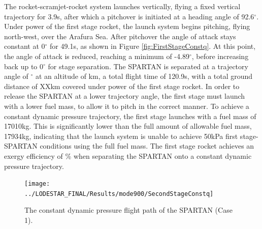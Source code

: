 The rocket-scramjet-rocket system launches vertically, flying a fixed vertical trajectory for 3.9s, after which a pitchover is initiated at a heading angle of 92.6$^\circ$. Under power of the first stage rocket, the launch system begins pitching, flying north-west, over the Arafura Sea. 
After pitchover the angle of attack stays constant at 0$^\circ$ for 49.1s, as shown in Figure \ref{fig:FirstStageConstq}. At this point, the angle of attack is reduced, reaching a minimum of -4.89$^\circ$, before increasing back up to 0$^\circ$ for stage separation. 
The SPARTAN is separated at a trajectory angle of \firstsecondSeparationgammaConstq$^\circ$ at an altitude of \firstsecondSeparationAltConstq km, a total flight time of 120.9s, with a total ground distance of XXkm covered under power of the first stage rocket. 
 In order to release the SPARTAN at a lower trajectory angle, the first stage must launch with a lower fuel mass, to allow it to pitch in the correct manner. To achieve a constant dynamic pressure trajectory, the first stage launches with a fuel mass of 17010kg. This is significantly lower than the full amount of allowable fuel mass, 17934kg, indicating that the launch system is unable to achieve 50kPa first stage-SPARTAN conditions using the full fuel mass. 
The first stage rocket achieves an exergy efficiency of \firstExergyEffConstq \% when separating the SPARTAN onto a constant dynamic pressure trajectory. 


\begin{figure}[ht!]
\centering
\texttt{[image: ../LODESTAR\_FINAL/Results/mode900/SecondStageConstq]}
\caption{The constant dynamic pressure flight path of the SPARTAN (Case 1).}
\label{fig:SecondStageConstq}
\end{figure}



